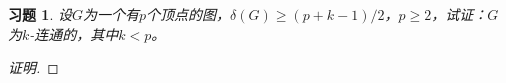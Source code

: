 \documentclass{article}
\begin{document}
\begin{CJK}{UTF8}{gbsn}
\newtheorem*{Exercise}{习题}
\begin{Exercise}
  设$G$为一个有$p$个顶点的图，$\delta(G) \geq (p+k-1)/2$，$p\geq 2$，试证：$G$为$k$-连通的，其中$k<p$。
\end{Exercise}
\begin{proof}[证明]
  
\end{proof}

\end{CJK}
\end{document}
